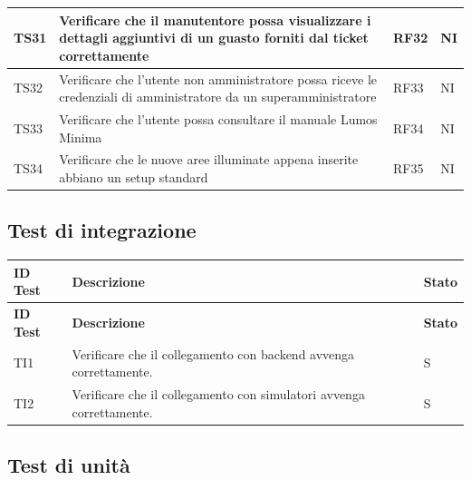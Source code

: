 \documentclass[12pt]{article}
\begin{document}
\begin{xltabular}{\linewidth}{|>{\hsize}X|>{\hsize}X|>{\hsize}X|>{\hsize}X|}
	\hline
	TS31	 & Verificare che il manutentore possa visualizzare i dettagli aggiuntivi di un guasto forniti dal ticket correttamente	&	RF32	&	NI	\\
	\hline
	TS32	 & Verificare che l'utente non amministratore possa riceve le credenziali di amministratore da un superamministratore	&	RF33	&	NI	\\
	\hline
	TS33	 & Verificare che l'utente possa consultare il manuale Lumos Minima	&	RF34	&	NI	\\
	\hline
	TS34	 & Verificare che le nuove aree illuminate appena inserite abbiano un setup standard	&	RF35	&	NI	\\

\end{xltabular}

\subsection{Test di integrazione}
\footnotesize
\begin{xltabular}{\linewidth}{|>{\hsize}X|X|>{\hsize}X|}

	\hline
	\textbf{ID Test} & \textbf{Descrizione} & \textbf{Stato} \\
	\hline
	\endfirsthead
	\hline
	\textbf{ID Test} & \textbf{Descrizione}  & \textbf{Stato} \\
	\hline
	\endhead
	\hline
	\endfoot
	TI1 & Verificare che il collegamento con backend avvenga correttamente. & S \\ \hline
	TI2 & Verificare che il collegamento con simulatori avvenga correttamente. & S \\ \hline


\end{xltabular}

\subsection{Test di unità}
\end{document}
